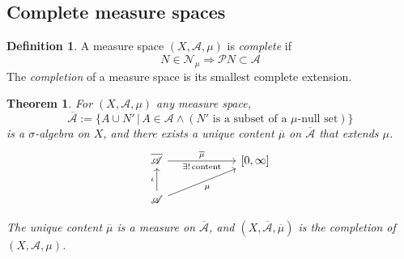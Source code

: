 \documentclass[11pt, a4paper, openany]{book}
\newtheorem{thm}{Theorem}\newtheorem{lem}{Lemma}\newtheorem{crl}{Corollary}
\theoremstyle{definition}
\newtheorem{define}{Definition}\newtheorem{exam}{Example}\newtheorem{remark}{Remark}
\begin{document}
\subsection{Complete measure spaces}
    \begin{define}
        A measure space $(X,\mathscr{A},\mu)$ is \textit{complete} if
        \[N\in\mathscr{N}_\mu\Longrightarrow \mathscr{P}N\subset \mathscr{A}\]
        The \textit{completion} of a measure space is its smallest complete extension.
    \end{define}
    \begin{thm}
        For $(X,\mathscr{A},\mu)$ any measure space,
        \[\overline{\mathscr{A}}:=\{A\cup N'\,|\,A\in\mathscr{A}\wedge (N'\text{ is a subset of a }\mu\text{-null set})\}\]
        is a $\sigma$-algebra on $X$, and there exists a unique content $\overline{\mu}$ on $\overline{\mathscr{A}}$ that extends $\mu$.
        \[
            \begin{tikzcd}[column sep = 60pt]
                \overline{\mathscr{A}} \ar[r, "\overline{\mu}", "\exists!\,\text{content}"'] & {[0,\infty]}\\
                \mathscr{A} \ar[ur, "\mu"'] \ar[u, "\iota"] &
            \end{tikzcd}
        \]
        
        The unique content $\overline{\mu}$ is a measure on $\overline{\mathscr{A}}$, and $(X,\overline{\mathscr{A}},\overline{\mu})$ is the completion of $(X,\mathscr{A},\mu)$.
    \end{thm}
\end{document}
